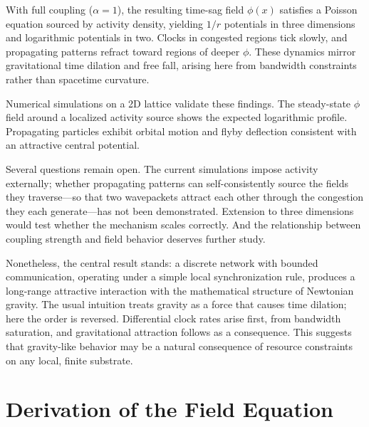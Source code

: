 \documentclass[aps, pra, reprint, superscriptaddress, nofootinbib, singlespacing]{revtex4-2}
\begin{document}
With full coupling ($\alpha = 1$), the resulting time-sag field $\phi(x)$ satisfies a Poisson equation sourced by activity density, yielding $1/r$ potentials in three dimensions and logarithmic potentials in two. Clocks in congested regions tick slowly, and propagating patterns refract toward regions of deeper $\phi$. These dynamics mirror gravitational time dilation and free fall, arising here from bandwidth constraints rather than spacetime curvature.

Numerical simulations on a 2D lattice validate these findings. The steady-state $\phi$ field around a localized activity source shows the expected logarithmic profile. Propagating particles exhibit orbital motion and flyby deflection consistent with an attractive central potential.

Several questions remain open. The current simulations impose activity externally; whether propagating patterns can self-consistently source the fields they traverse—so that two wavepackets attract each other through the congestion they each generate—has not been demonstrated. Extension to three dimensions would test whether the mechanism scales correctly. And the relationship between coupling strength and field behavior deserves further study.

Nonetheless, the central result stands: a discrete network with bounded communication, operating under a simple local synchronization rule, produces a long-range attractive interaction with the mathematical structure of Newtonian gravity. The usual intuition treats gravity as a force that causes time dilation; here the order is reversed. Differential clock rates arise first, from bandwidth saturation, and gravitational attraction follows as a consequence. This suggests that gravity-like behavior may be a natural consequence of resource constraints on any local, finite substrate.

\appendix
\section{Derivation of the Field Equation}
\label{app:derivation}
\end{document}
